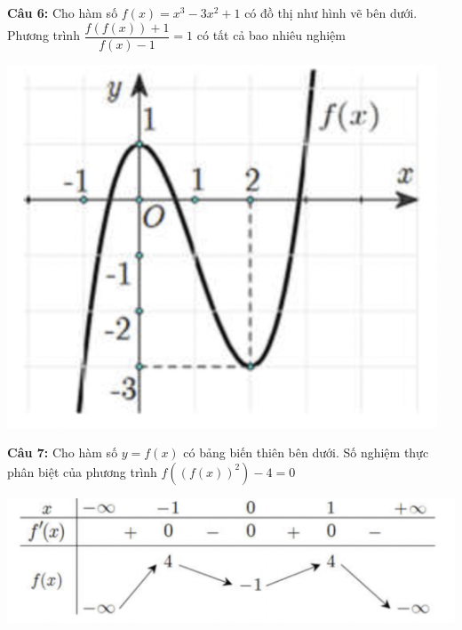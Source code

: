 \documentclass[12pt, a4paper]{article}
\begin{document}
\vspace{-0.6cm}
				
		\textbf{Câu 6: } Cho hàm số $f(x)=x^3-3x^2+1$ có đồ thị như hình vẽ bên dưới. Phương trình $\dfrac{f(f(x))+1}{f(x)-1}=1$ có tất cả bao nhiêu nghiệm

\vspace{-0.6cm}

			\begin{center}
				\includegraphics[scale=0.6]{../images/tuonggiao_cau6.png}
			\end{center}
			
\vspace{-0.6cm}
			
		\textbf{Câu 7: } Cho hàm số $y=f(x)$ có bảng biến thiên bên dưới. Số nghiệm thực phân biệt của phương trình $f \left(\left(f(x)\right)^2\right)-4=0$
		
\vspace{-0.6cm}
		
			\begin{center}
				\includegraphics[scale=0.6]{../images/tuonggiao_cau7.png}
			\end{center}
			
\end{document}
